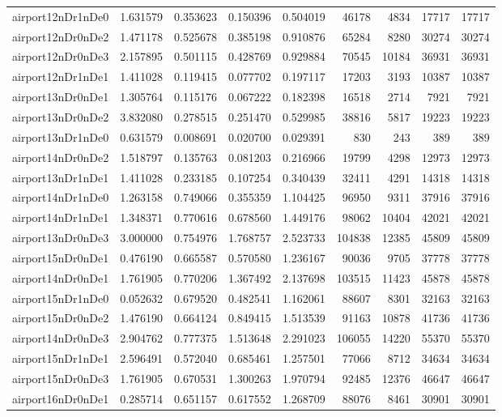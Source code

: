 \documentclass[../../../thesis.tex]{subfiles}
\begin{document}
\begin{longtable}{|l|r|r|r|r|r|r|r|r|}
airport12nDr1nDe0 & 1.631579 & 0.353623 & 0.150396 & 0.504019 & 46178 & 4834 & 17717 & 17717 \\
airport12nDr0nDe2 & 1.471178 & 0.525678 & 0.385198 & 0.910876 & 65284 & 8280 & 30274 & 30274 \\
airport12nDr0nDe3 & 2.157895 & 0.501115 & 0.428769 & 0.929884 & 70545 & 10184 & 36931 & 36931 \\
airport12nDr1nDe1 & 1.411028 & 0.119415 & 0.077702 & 0.197117 & 17203 & 3193 & 10387 & 10387 \\
airport13nDr0nDe1 & 1.305764 & 0.115176 & 0.067222 & 0.182398 & 16518 & 2714 & 7921 & 7921 \\
airport13nDr0nDe2 & 3.832080 & 0.278515 & 0.251470 & 0.529985 & 38816 & 5817 & 19223 & 19223 \\
airport13nDr1nDe0 & 0.631579 & 0.008691 & 0.020700 & 0.029391 & 830 & 243 & 389 & 389 \\
airport14nDr0nDe2 & 1.518797 & 0.135763 & 0.081203 & 0.216966 & 19799 & 4298 & 12973 & 12973 \\
airport13nDr1nDe1 & 1.411028 & 0.233185 & 0.107254 & 0.340439 & 32411 & 4291 & 14318 & 14318 \\
airport14nDr1nDe0 & 1.263158 & 0.749066 & 0.355359 & 1.104425 & 96950 & 9311 & 37916 & 37916 \\
airport14nDr1nDe1 & 1.348371 & 0.770616 & 0.678560 & 1.449176 & 98062 & 10404 & 42021 & 42021 \\
airport13nDr0nDe3 & 3.000000 & 0.754976 & 1.768757 & 2.523733 & 104838 & 12385 & 45809 & 45809 \\
airport15nDr0nDe1 & 0.476190 & 0.665587 & 0.570580 & 1.236167 & 90036 & 9705 & 37778 & 37778 \\
airport14nDr0nDe1 & 1.761905 & 0.770206 & 1.367492 & 2.137698 & 103515 & 11423 & 45878 & 45878 \\
airport15nDr1nDe0 & 0.052632 & 0.679520 & 0.482541 & 1.162061 & 88607 & 8301 & 32163 & 32163 \\
airport15nDr0nDe2 & 1.476190 & 0.664124 & 0.849415 & 1.513539 & 91163 & 10878 & 41736 & 41736 \\
airport14nDr0nDe3 & 2.904762 & 0.777375 & 1.513648 & 2.291023 & 106055 & 14220 & 55370 & 55370 \\
airport15nDr1nDe1 & 2.596491 & 0.572040 & 0.685461 & 1.257501 & 77066 & 8712 & 34634 & 34634 \\
airport15nDr0nDe3 & 1.761905 & 0.670531 & 1.300263 & 1.970794 & 92485 & 12376 & 46647 & 46647 \\
airport16nDr0nDe1 & 0.285714 & 0.651157 & 0.617552 & 1.268709 & 88076 & 8461 & 30901 & 30901 \\

\end{longtable}
\end{document}
